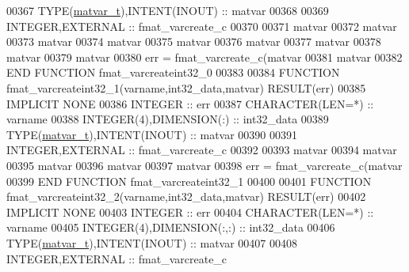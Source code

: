 \begin{DoxyCode}
00367     \textcolor{keywordtype}{TYPE}(\hyperlink{group___m_a_t_structmatvar__t}{matvar\_t}),\textcolor{keywordtype}{INTENT(INOUT)}    :: matvar
00368 
00369     \textcolor{keywordtype}{INTEGER},\textcolor{keywordtype}{EXTERNAL}                :: fmat\_varcreate\_c
00370 
00371     matvar%
00372     matvar%
00373     matvar%
00374     matvar%
00375     matvar%
00376     matvar%
00377     matvar%
00378     matvar%
00379     matvar%
00380     err = fmat\_varcreate\_c(matvar%
00381                            matvar%
00382 \textcolor{keyword}{END FUNCTION }fmat\_varcreateint32\_0
00383 
00384 \textcolor{keyword}{FUNCTION }fmat\_varcreateint32\_1(varname,int32\_data,matvar) \textcolor{keyword}{RESULT}(err)
00385 \textcolor{keywordtype}{IMPLICIT NONE}
00386     \textcolor{keywordtype}{INTEGER}                         :: err
00387     \textcolor{keywordtype}{CHARACTER(LEN=*)}                :: varname
00388     \textcolor{keywordtype}{INTEGER(4)},\textcolor{keywordtype}{DIMENSION(:)}   :: int32\_data
00389     \textcolor{keywordtype}{TYPE}(\hyperlink{group___m_a_t_structmatvar__t}{matvar\_t}),\textcolor{keywordtype}{INTENT(INOUT)}    :: matvar
00390 
00391     \textcolor{keywordtype}{INTEGER},\textcolor{keywordtype}{EXTERNAL}                :: fmat\_varcreate\_c
00392 
00393     matvar%
00394     matvar%
00395     matvar%
00396     matvar%
00397     matvar%
00398     err = fmat\_varcreate\_c(matvar%
00399 \textcolor{keyword}{END FUNCTION }fmat\_varcreateint32\_1
00400 
00401 \textcolor{keyword}{FUNCTION }fmat\_varcreateint32\_2(varname,int32\_data,matvar) \textcolor{keyword}{RESULT}(err)
00402 \textcolor{keywordtype}{IMPLICIT NONE}
00403     \textcolor{keywordtype}{INTEGER}                         :: err
00404     \textcolor{keywordtype}{CHARACTER(LEN=*)}                :: varname
00405     \textcolor{keywordtype}{INTEGER(4)},\textcolor{keywordtype}{DIMENSION(:,:)} :: int32\_data
00406     \textcolor{keywordtype}{TYPE}(\hyperlink{group___m_a_t_structmatvar__t}{matvar\_t}),\textcolor{keywordtype}{INTENT(INOUT)}    :: matvar
00407 
00408     \textcolor{keywordtype}{INTEGER},\textcolor{keywordtype}{EXTERNAL}                :: fmat\_varcreate\_c

\end{DoxyCode}
